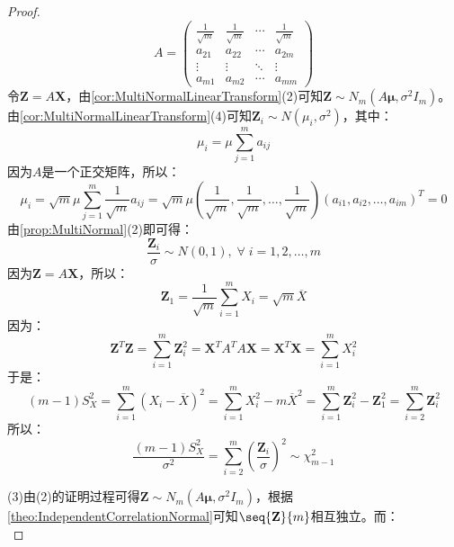 \begin{proof}
\begin{equation*}
		A=
		\begin{pmatrix}
			\frac{1}{\sqrt{m}} & \frac{1}{\sqrt{m}} & \cdots & \frac{1}{\sqrt{m}} \\
			a_{21} & a_{22} & \cdots & a_{2m} \\
			\vdots & \vdots & \ddots & \vdots \\
			a_{m1} & a_{m2} & \cdots & a_{mm}
		\end{pmatrix}
	\end{equation*}
	令$\mathbf{Z}=A\mathbf{X}$，由\cref{cor:MultiNormalLinearTransform}(2)可知$\mathbf{Z}\sim N_m(A\boldsymbol{\mu},\sigma^2I_m)$。由\cref{cor:MultiNormalLinearTransform}(4)可知$\mathbf{Z}_i\sim N(\mu_i,\sigma^2)$，其中：
	\begin{equation*}
		\mu_i=\mu\sum_{j=1}^{m}a_{ij}
	\end{equation*}
	因为$A$是一个正交矩阵，所以：
	\begin{equation*}
		\mu_i=\sqrt{m}\mu\sum_{j=1}^{m}\frac{1}{\sqrt{m}}a_{ij}=\sqrt{m}\mu\left(\dfrac{1}{\sqrt{m}},\dfrac{1}{\sqrt{m}},\dots,\dfrac{1}{\sqrt{m}}\right)(a_{i1},a_{i2},\dots,a_{im})^T=0
	\end{equation*}
	由\cref{prop:MultiNormal}(2)即可得：
	\begin{equation*}
		\frac{\mathbf{Z}_i}{\sigma}\sim N(0,1),\;\forall\;i=1,2,\dots,m
	\end{equation*}
	因为$\mathbf{Z}=A\mathbf{X}$，所以：
	\begin{equation*}
		\mathbf{Z}_1=\frac{1}{\sqrt{m}}\sum_{i=1}^{m}X_i=\sqrt{m}\overline{X}
	\end{equation*}
	因为：
	\begin{equation*}
		\mathbf{Z}^T\mathbf{Z}=\sum_{i=1}^{m}\mathbf{Z}_i^2=\mathbf{X}^TA^TA\mathbf{X}=\mathbf{X}^T\mathbf{X}=\sum_{i=1}^{m}X_i^2
	\end{equation*}
	于是：
	\begin{equation*}
		(m-1)S_X^2=\sum_{i=1}^{m}(X_i-\overline{X})^2=\sum_{i=1}^{m}X_i^2-m\overline{X}^2=\sum_{i=1}^{m}\mathbf{Z}_i^2-\mathbf{Z}_1^2=\sum_{i=2}^{m}\mathbf{Z}_i^2
	\end{equation*}
	所以：
	\begin{equation*}
		\frac{(m-1)S_X^2}{\sigma^2}=\sum_{i=2}^{m}\left(\frac{\mathbf{Z}_i}{\sigma}\right)^2\sim\chi_{m-1}^2
	\end{equation*}\par
	(3)由(2)的证明过程可得$\mathbf{Z}\sim N_m(A\boldsymbol{\mu},\sigma^2I_m)$，根据\cref{theo:IndependentCorrelationNormal}可知$\seq{\mathbf{Z}}{m}$相互独立。而：
	\begin{equation*}

\end{equation*}
\end{proof}
